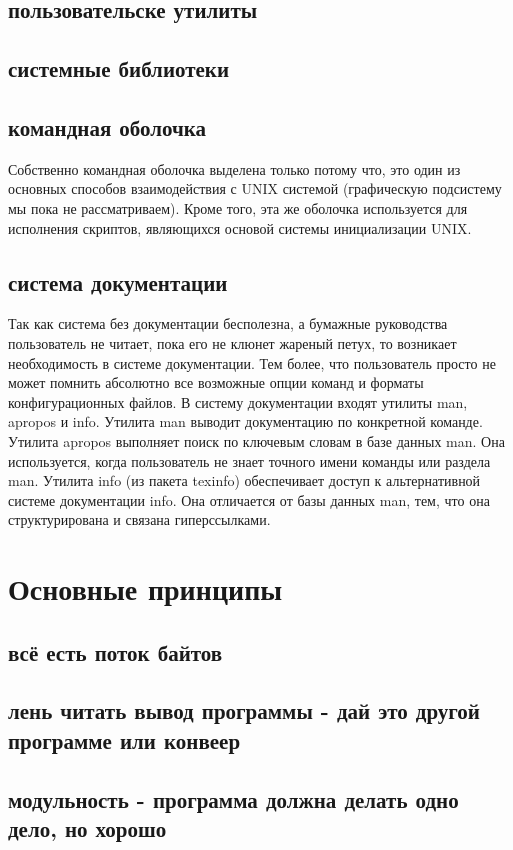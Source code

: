\subsection{пользовательске утилиты}
\subsection{системные библиотеки}
\subsection{командная оболочка}
Собственно командная оболочка выделена только потому что, это один из основных способов взаимодействия с UNIX системой (графическую подсистему мы пока не рассматриваем). Кроме того, эта же оболочка используется для исполнения скриптов, являющихся основой системы инициализации UNIX.
\subsection{система документации}
Так как система без документации бесполезна, а бумажные руководства пользователь не читает, пока его не клюнет жареный петух, то возникает необходимость в системе документации. Тем более, что пользователь просто не может помнить абсолютно все возможные опции команд и форматы конфигурационных файлов.
В систему документации входят утилиты man, apropos и info.
Утилита man выводит документацию по конкретной команде.
Утилита apropos выполняет поиск по ключевым словам в базе данных man. Она используется, когда пользователь не знает точного имени команды или раздела man.
Утилита info (из пакета texinfo) обеспечивает доступ к альтернативной системе документации info. Она отличается от базы данных man, тем, что она структурирована и связана гиперссылками.
\section {Основные принципы}
\subsection{всё есть поток байтов}
\subsection{лень читать вывод программы - дай это другой программе или конвеер}
\subsection{модульность - программа должна делать одно дело, но хорошо}
